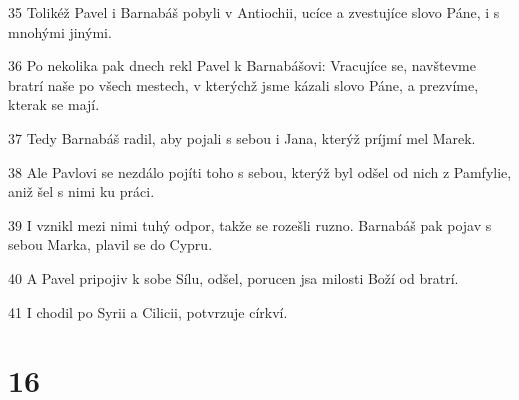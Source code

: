 \par 35 Tolikéž Pavel i Barnabáš pobyli v Antiochii, ucíce a zvestujíce slovo Páne, i s mnohými jinými.
\par 36 Po nekolika pak dnech rekl Pavel k Barnabášovi: Vracujíce se, navštevme bratrí naše po všech mestech, v kterýchž jsme kázali slovo Páne, a prezvíme, kterak se mají.
\par 37 Tedy Barnabáš radil, aby pojali s sebou i Jana, kterýž príjmí mel Marek.
\par 38 Ale Pavlovi se nezdálo pojíti toho s sebou, kterýž byl odšel od nich z Pamfylie, aniž šel s nimi ku práci.
\par 39 I vznikl mezi nimi tuhý odpor, takže se rozešli ruzno. Barnabáš pak pojav s sebou Marka, plavil se do Cypru.
\par 40 A Pavel pripojiv k sobe Sílu, odšel, porucen jsa milosti Boží od bratrí.
\par 41 I chodil po Syrii a Cilicii, potvrzuje církví.

\chapter{16}

